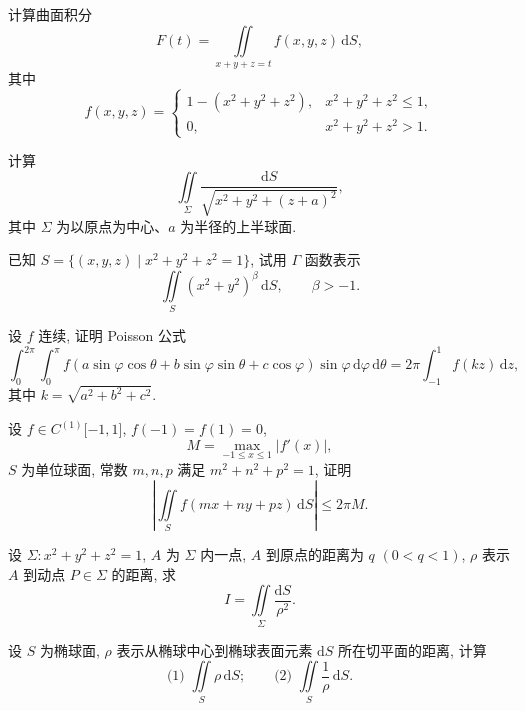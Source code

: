 \documentclass[../数学分析培优讲义.tex]{subfiles}
\begin{document}
\begin{example}
计算曲面积分
\[
    F(t)=\iint\limits_{x+y+z=t}f(x,y,z)\,\mathrm{d}S,
\]
其中
\[
    f(x,y,z)=
    \begin{cases}
        1-(x^2+y^2+z^2), & x^2+y^2+z^2\leq1,\\
        0, & x^2+y^2+z^2>1.
    \end{cases}
\]
\end{example}
\exampleblank

\begin{example}
计算
\[
    \iint\limits_\Sigma\dfrac{\mathrm{d}S}{\sqrt{x^2+y^2+(z+a)^2}},
\]
其中 $\Sigma$ 为以原点为中心、$a$ 为半径的上半球面.
\end{example}
\exampleblank

\begin{example}
已知 $S=\{(x,y,z)\mid x^2+y^2+z^2=1\}$, 试用 $\Gamma$ 函数表示
\[
    \iint\limits_S(x^2+y^2)^\beta\,\mathrm{d}S,
    \qquad \beta>-1.
\]
\end{example}
\exampleblank

\begin{example}
设 $f$ 连续, 证明 Poisson 公式
\[
    \int_0^{2\pi}\int_0^\pi
    f(a\sin\varphi\cos\theta+b\sin\varphi\sin\theta+c\cos\varphi)
    \sin\varphi\,\mathrm{d}\varphi\,\mathrm{d}\theta
    =2\pi\int_{-1}^1f(kz)\,\mathrm{d}z,
\]
其中 $k=\sqrt{a^2+b^2+c^2}$.
\end{example}
\exampleblank

\begin{example}
设 $f\in C^{(1)}\lbrack-1,1\rbrack$, $f(-1)=f(1)=0$,
\[
    M=\max_{-1\leq x\leq1}|f'(x)|,
\]
$S$ 为单位球面, 常数 $m,n,p$ 满足 $m^2+n^2+p^2=1$, 证明
\[
    \left|\iint\limits_Sf(mx+ny+pz)\,\mathrm{d}S\right|\leq2\pi M.
\]
\end{example}
\exampleblank

\begin{example}
设 $\Sigma:x^2+y^2+z^2=1$, $A$ 为 $\Sigma$ 内一点, $A$ 到原点的距离为 $q$ $(0<q<1)$, $\rho$ 表示 $A$ 到动点 $P\in\Sigma$ 的距离, 求
\[
    I=\iint\limits_\Sigma\dfrac{\mathrm{d}S}{\rho^2}.
\]
\end{example}
\exampleblank

\begin{example}
设 $S$ 为椭球面, $\rho$ 表示从椭球中心到椭球表面元素 $\mathrm{d}S$ 所在切平面的距离, 计算
\[
    \text{(1) }\iint\limits_S\rho\,\mathrm{d}S;
    \qquad
    \text{(2) }\iint\limits_S\dfrac{1}{\rho}\,\mathrm{d}S.
\]
\end{example}
\exampleblank
\end{document}
